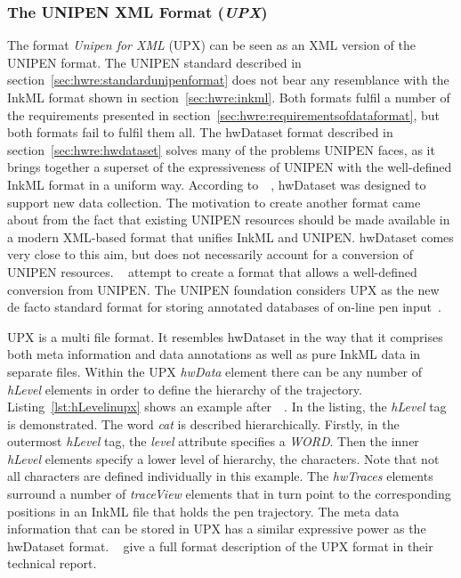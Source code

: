 \subsubsection{The UNIPEN XML Format (\emph{UPX})}
\label{sec:hwre:unipenformatupx}

The format \emph{Unipen for XML} (UPX) can be seen as an XML version of the
UNIPEN format. The UNIPEN standard described in 
section~\ref{sec:hwre:standardunipenformat} does not bear any resemblance
with the InkML format shown in section~\ref{sec:hwre:inkml}.
Both formats fulfil a number of the requirements presented in 
section~\ref{sec:hwre:requirementsofdataformat}, but both formats fail to 
fulfil them all. The hwDataset format described in 
section~\ref{sec:hwre:hwdataset} solves many of the problems UNIPEN faces,
as it brings together a superset of the expressiveness of UNIPEN with
the well-defined InkML format in a uniform way.
According to~~\citeyear{Agrawal2005}, hwDataset
was designed to support new data collection. The motivation to create another
format came about from the fact that existing UNIPEN resources should be made
available in a modern XML-based format that unifies InkML and UNIPEN.
hwDataset comes very close to this aim, but does not necessarily account for a 
conversion of UNIPEN resources. 
~\citeyear{Agrawal2005} attempt to create a format 
that allows a well-defined conversion from UNIPEN.
The UNIPEN foundation considers UPX as the new de facto standard format for 
storing annotated databases of on-line pen 
input~.

UPX is a multi file format. It resembles hwDataset in the way that it comprises 
both meta information and data annotations as well as pure InkML data in 
separate files. Within the UPX \emph{hwData} element there can be any number
of \emph{hLevel} elements in order to define the hierarchy of the trajectory.
Listing~\ref{lst:hLevelinupx} shows an example 
after~~\citeyear{UnipenConsortium2006}. 
In the listing, the \emph{hLevel} tag is demonstrated. 
The word \emph{cat} is described hierarchically.
Firstly, in the outermost \emph{hLevel} tag, the \emph{level} attribute specifies
a \emph{WORD}. Then the inner \emph{hLevel} elements specify a lower level
of hierarchy, the characters. Note that not all characters are defined
individually in this example.
The \emph{hwTraces} elements surround a number of \emph{traceView} elements that
in turn point to the corresponding positions in an InkML file that holds the 
pen trajectory. The meta data information that can be stored in UPX has a 
similar expressive power as the hwDataset format.
~\citeyear{Madhvanath2006} give a full format 
description of the UPX format in their technical report.

